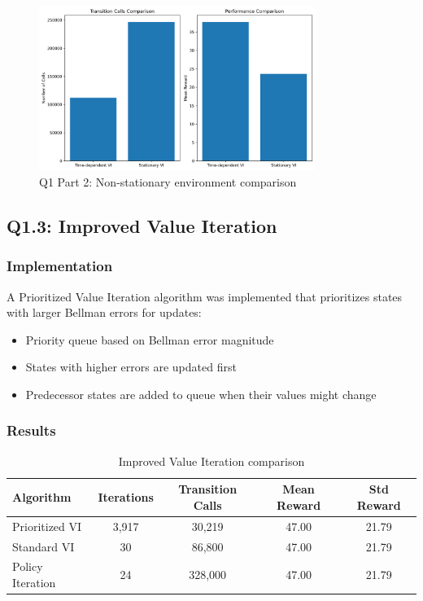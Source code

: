 \documentclass[10pt,a4paper]{article}
\begin{document}
\begin{figure}[H]
\centering
\includegraphics[width=0.8\textwidth]{../Q1/part2/q1_part2_results.png}
\caption{Q1 Part 2: Non-stationary environment comparison}
\end{figure}

\clearpage
\subsection{Q1.3: Improved Value Iteration}

\subsubsection{Implementation}

A Prioritized Value Iteration algorithm was implemented that prioritizes states with larger Bellman errors for updates:
\begin{itemize}
    \item Priority queue based on Bellman error magnitude
    \item States with higher errors are updated first
    \item Predecessor states are added to queue when their values might change
\end{itemize}

\subsubsection{Results}

\begin{table}[H]
\centering
\caption{Improved Value Iteration comparison}
\begin{tabular}{lcccc}
\toprule
Algorithm & Iterations & Transition Calls & Mean Reward & Std Reward \\
\midrule
Prioritized VI & 3,917 & 30,219 & 47.00 & 21.79 \\
Standard VI & 30 & 86,800 & 47.00 & 21.79 \\
Policy Iteration & 24 & 328,000 & 47.00 & 21.79 \\
\bottomrule
\end{tabular}
\end{table}
\end{document}
